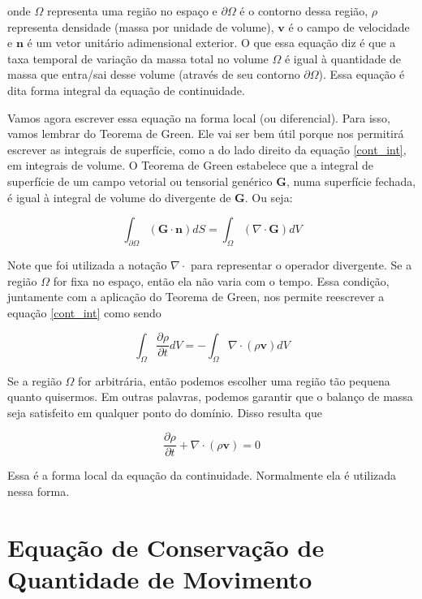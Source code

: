 \documentclass[a4paper,portuguese,10pt]{article}
\renewcommand{\div}{\nabla\cdot}
\renewcommand{\D}{\partial}
\renewcommand{\vec}{\mathbf}
\begin{document}
onde $\Omega$ representa uma região no espaço e $\D\Omega$ é o contorno dessa região, $\rho$ representa densidade (massa por unidade de volume), $\vec{v}$ é o campo de velocidade e $\vec{n}$ é um vetor unitário adimensional exterior. O que essa equação diz é que a taxa temporal de variação da massa total no volume $\Omega$ é igual à quantidade de massa que entra/sai desse volume (através de seu contorno $\D\Omega$). Essa equação é dita forma integral da equação de continuidade.

Vamos agora escrever essa equação na forma local (ou diferencial). Para isso, vamos lembrar do Teorema de Green. Ele vai ser bem útil porque nos permitirá escrever as integrais de superfície, como a do lado direito da equação \ref{cont_int}, em integrais de volume. O Teorema de Green estabelece que a integral de superfície de um campo vetorial ou tensorial genérico $\vec{G}$, numa superfície fechada, é igual à integral de volume do divergente de $\vec{G}$. Ou seja:

\begin{equation}
  \int_{\D\Omega}(\vec{G}\cdot\vec{n})dS = \int_{\Omega}(\nabla\cdot\vec{G})dV
  \label{teo_green}
\end{equation}

Note que foi utilizada a notação $\nabla\cdot$ para representar o operador divergente. Se a região $\Omega$ for fixa no espaço, então ela não varia com o tempo. Essa condição, juntamente com a aplicação do Teorema de Green, nos permite reescrever a equação \ref{cont_int} como sendo

\begin{equation}
  \int_{\Omega}\frac{\D\rho}{\D t}dV = -\int_{\Omega}\div(\rho\vec{v})dV
  \label{cont_int_dif}
\end{equation}

Se a região $\Omega$ for arbitrária, então podemos escolher uma região tão pequena quanto quisermos. Em outras palavras, podemos garantir que o balanço de massa seja satisfeito em qualquer ponto do domínio. Disso resulta que

\begin{equation}
  \frac{\D\rho}{\D t} + \div(\rho\vec{v}) = 0
  \label{eq_cont_dif}
\end{equation}

Essa é a forma local da equação da continuidade. Normalmente ela é utilizada nessa forma.

\section{Equação de Conservação de Quantidade de Movimento}
\end{document}
